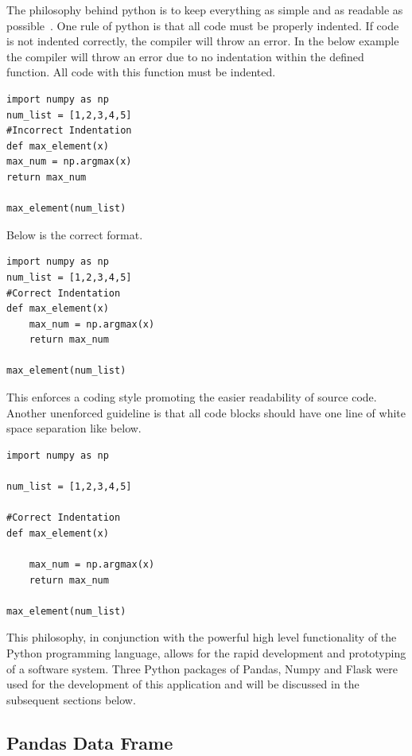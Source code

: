 The philosophy behind python is to keep everything as simple and as readable as possible~\cite{PEP20The74:online}.
One rule of python is that all code must be properly indented. If code is not indented correctly, the compiler will throw an error.
In the below example the compiler will throw an error due to no indentation within the defined function. All code with this function must be indented.
\begin{verbatim}
import numpy as np
num_list = [1,2,3,4,5]
#Incorrect Indentation
def max_element(x)
max_num = np.argmax(x)
return max_num

max_element(num_list)
\end{verbatim}
Below is the correct format.
\begin{verbatim}
import numpy as np
num_list = [1,2,3,4,5]
#Correct Indentation
def max_element(x)
	max_num = np.argmax(x)
	return max_num

max_element(num_list)
\end{verbatim}

This enforces  a coding style promoting the easier readability of source code.
Another unenforced guideline is that all code blocks should have one line of white space separation like below.
\begin{verbatim}
import numpy as np

num_list = [1,2,3,4,5]

#Correct Indentation
def max_element(x)

	max_num = np.argmax(x)
	return max_num

max_element(num_list)
\end{verbatim}

This philosophy, in conjunction with the powerful high level functionality of the Python programming language, allows for the rapid development and prototyping of a software system. Three Python packages of Pandas, Numpy and Flask were used for the development of this application and will be discussed in the subsequent sections below.

\subsection{Pandas Data Frame}

